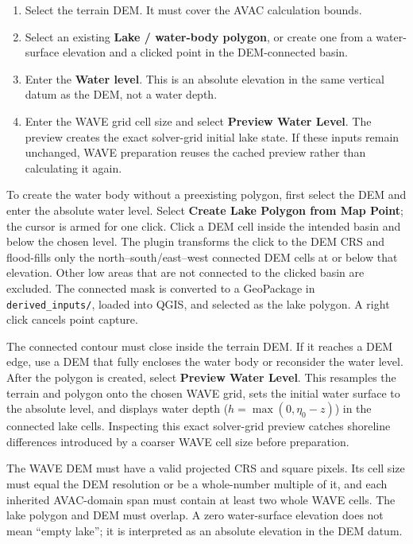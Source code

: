 \documentclass[11pt,a4paper]{article}
\newcommand{\control}[1]{\textbf{#1}}
\newcommand{\pathcode}[1]{\texttt{#1}}
\newenvironment{importantbox}{%
  \begin{tcolorbox}[colback=warnfill,colframe=warmred,boxrule=.6pt,
                     arc=2pt,left=6pt,right=6pt,top=5pt,bottom=5pt]
  \small
}{%
  \end{tcolorbox}
}
\begin{document}
\begin{enumerate}
  \item Select the terrain DEM. It must cover the AVAC calculation bounds.
  \item Select an existing \control{Lake / water-body polygon}, or create one
        from a water-surface elevation and a clicked point in the DEM-connected
        basin.
  \item Enter the \control{Water level}. This is an absolute elevation in the
        same vertical datum as the DEM, not a water depth.
  \item Enter the WAVE grid cell size and select \control{Preview Water Level}.
        The preview creates the exact solver-grid initial lake state. If these
        inputs remain unchanged, WAVE preparation reuses the cached preview
        rather than calculating it again.
\end{enumerate}

To create the water body without a preexisting polygon, first select the DEM
and enter the absolute water level. Select \control{Create Lake Polygon from
Map Point}; the cursor is armed for one click. Click a DEM cell inside the
intended basin and below the chosen level. The plugin transforms the click to
the DEM CRS and flood-fills only the north--south/east--west connected DEM
cells at or below that elevation. Other low areas that are not connected to
the clicked basin are excluded. The connected mask is converted to a
GeoPackage in \pathcode{derived\_inputs/}, loaded into QGIS, and selected as
the lake polygon. A right click cancels point capture.

The connected contour must close inside the terrain DEM. If it reaches a DEM
edge, use a DEM that fully encloses the water body or reconsider the water
level. After the polygon is created, select \control{Preview Water Level}.
This resamples the terrain and polygon onto the chosen WAVE grid, sets the
initial water surface to the absolute level, and displays water depth
($h=\max(0,\eta_0-z)$) in the connected lake cells. Inspecting this exact
solver-grid preview catches shoreline differences introduced by a coarser
WAVE cell size before preparation.

\begin{importantbox}
The WAVE DEM must have a valid projected CRS and square pixels. Its cell size
must equal the DEM resolution or be a whole-number multiple of it, and each
inherited AVAC-domain span must contain at least two whole WAVE cells. The lake
polygon and DEM must overlap. A zero water-surface elevation does not mean
``empty lake''; it is interpreted as an absolute elevation in the DEM datum.
\end{importantbox}
\end{document}
